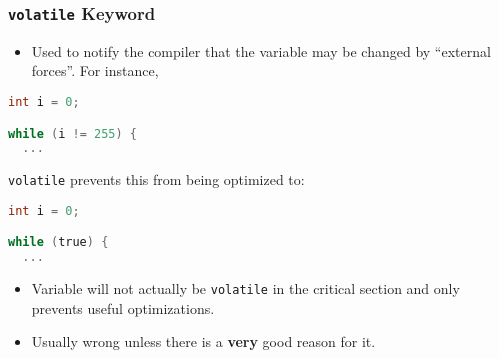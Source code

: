 \begin{frame}[fragile]
  \frametitle{{\tt volatile} Keyword}


  \begin{itemize}
    \item Used to notify the compiler that the variable may be changed by ``external forces''. For instance,
  \end{itemize}

  \begin{lstlisting}[language=C]
int i = 0;

while (i != 255) {
  ...
  \end{lstlisting}

{\tt volatile} prevents this from being optimized to:

  \begin{lstlisting}[language=C]
int i = 0;

while (true) {
  ...
  \end{lstlisting}

  \begin{itemize}
    \item Variable will not actually be {\tt volatile} in the critical section
      and only prevents useful optimizations.
    \item Usually wrong unless there is a {\bf very} good reason for it.
  \end{itemize}


\end{frame}




